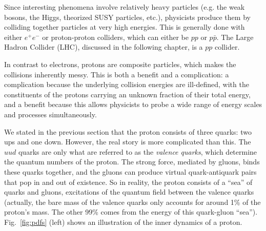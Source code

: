 Since interesting phenomena involve relatively heavy particles (e.g. the weak bosons,
the Higgs, theorized SUSY particles, etc.), physicists produce them by colliding together
particles at very high energies. This is generally done with either $e^+ e^-$ or proton-proton
colliders, which can either be $pp$ or $p\bar{p}$. The Large Hadron Collider (LHC), discussed in the following
chapter, is a $pp$ collider. 

In contrast to electrons, protons are composite particles, which makes the
collisions inherently messy. This is both a benefit and a complication: a complication because
the underlying collision energies are ill-defined, with the constituents of the protons carrying
an unknown fraction of their total energy, and a benefit because this allows physicists to probe
a wide range of energy scales and processes simultaneously.

We stated in the previous section that the proton consists of three quarks: two ups and one down.
However, the real story is more complicated than this. The $uud$ quarks are only what are referred
to as the \textit{valence quarks}, which determine the quantum numbers of the proton. The strong force,
mediated by gluons, binds these quarks together, and the gluons can produce virtual quark-antiquark
pairs that pop in and out of existence. So in reality, the proton consists of a ``sea'' of quarks
and gluons, excitations of the quantum field between the valence quarks (actually, the bare mass of the
valence quarks only accounts for around 1\% of the proton's mass. The other 99\% comes from the energy
of this quark-gluon ``sea''). Fig.~\ref{fig:pdfs} (left) shows an illustration of the inner dynamics
of a proton.

